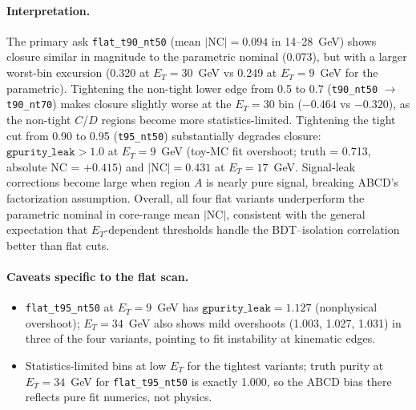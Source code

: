 \documentclass[11pt]{article}
\begin{document}
\paragraph{Interpretation.}
The primary ask \texttt{flat\_t90\_nt50} (mean $|\mathrm{NC}|=0.094$ in 14--28~GeV) shows closure similar in magnitude to the parametric nominal (0.073), but with a larger worst-bin excursion (0.320 at $E_T=30$~GeV vs 0.249 at $E_T=9$~GeV for the parametric). Tightening the non-tight lower edge from 0.5 to 0.7 (\texttt{t90\_nt50} $\to$ \texttt{t90\_nt70}) makes closure slightly worse at the $E_T=30$ bin ($-0.464$ vs $-0.320$), as the non-tight $C$/$D$ regions become more statistics-limited. Tightening the tight cut from 0.90 to 0.95 (\texttt{t95\_nt50}) substantially degrades closure: $\texttt{gpurity\_leak} > 1.0$ at $E_T=9$~GeV (toy-MC fit overshoot; truth = 0.713, absolute NC = $+0.415$) and $|\mathrm{NC}|=0.431$ at $E_T=17$~GeV. Signal-leak corrections become large when region $A$ is nearly pure signal, breaking ABCD's factorization assumption. Overall, all four flat variants underperform the parametric nominal in core-range mean $|\mathrm{NC}|$, consistent with the general expectation that $E_T$-dependent thresholds handle the BDT--isolation correlation better than flat cuts.

\paragraph{Caveats specific to the flat scan.}
\begin{itemize}
  \item \texttt{flat\_t95\_nt50} at $E_T=9$~GeV has $\texttt{gpurity\_leak} = 1.127$ (nonphysical overshoot); $E_T=34$~GeV also shows mild overshoots (1.003, 1.027, 1.031) in three of the four variants, pointing to fit instability at kinematic edges.
  \item Statistics-limited bins at low $E_T$ for the tightest variants; truth purity at $E_T=34$~GeV for \texttt{flat\_t95\_nt50} is exactly 1.000, so the ABCD bias there reflects pure fit numerics, not physics.
\end{itemize}

\end{document}
